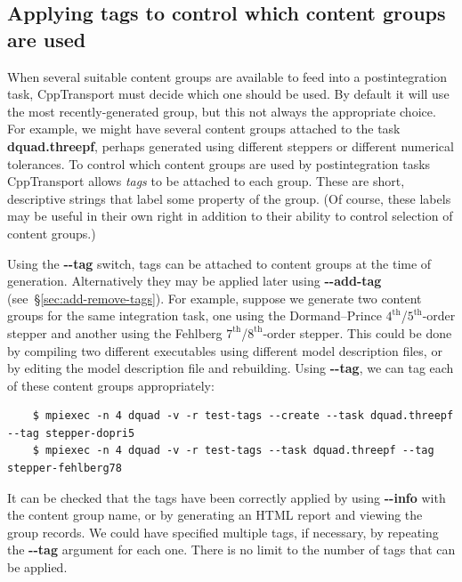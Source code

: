 \documentclass[11pt,a4paper]{article}
\newcommand{\repoobject}[1]{{\ttfamily\bfseries\small #1}}
\newcommand{\packagefont}{\sffamily}
\newcommand{\CppTransport}{{\packagefont CppTransport}}
\newcommand{\option}[1]{{\ttfamily\bfseries\small #1}}
\begin{document}
\subsection{Applying tags to control which content groups are used}
\label{sec:apply-tags}
When several suitable content groups are available
to feed into a postintegration task,
{\CppTransport} must decide which one should be used.
By default it will use the most recently-generated group, but this
not always the appropriate choice.
For example, we might have several content groups attached to the
task \repoobject{dquad.threepf}, perhaps generated using
different steppers or different numerical tolerances.
To control which content groups are used by postintegration tasks
{\CppTransport} allows \emph{tags} to be attached to each group.
These are short, descriptive strings that label some property
of the group.
(Of course, these labels may be useful in their own right in addition
to their ability to control selection of content groups.)

Using the \option{{-}{-}tag} switch,
tags can be attached to content groups at the time of generation.
Alternatively
they may be applied later
using \option{{-}{-}add-tag}
(see~\S\ref{sec:add-remove-tags}).
For example, suppose we generate two content groups
for the same integration task,
one
using the
Dormand--Prince $4^{\mathrm{th}}$/$5^{\mathrm{th}}$-order
stepper and another using the
Fehlberg $7^{\mathrm{th}}$/$8^{\mathrm{th}}$-order stepper.
This could be done
by compiling two different executables using different
model description files, or by editing the model description file
and rebuilding.
Using \option{{-}{-}tag},
we can tag each of these content groups appropriately:
\begin{verbatim}
    $ mpiexec -n 4 dquad -v -r test-tags --create --task dquad.threepf --tag stepper-dopri5
    $ mpiexec -n 4 dquad -v -r test-tags --task dquad.threepf --tag stepper-fehlberg78
\end{verbatim}
It can be checked that the tags have been correctly applied
by using \option{{-}{-}info} with the content group
name, or by generating an HTML report
and viewing the group records.
We could have specified multiple tags, if necessary, by repeating
the \option{{-}{-}tag} argument for each one.
There is no limit to the number of tags that can be applied.
\end{document}
